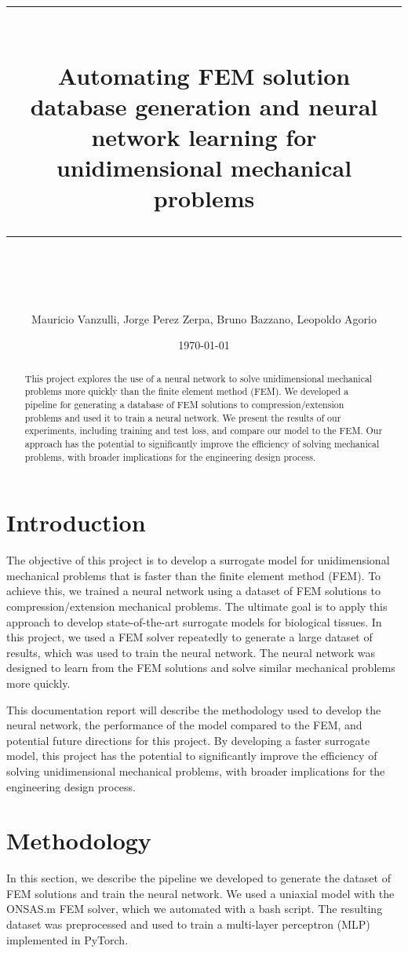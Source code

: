 \documentclass[11pt]{scrartcl} %
\title{	
	\normalfont\normalsize
	\textsc{}\\ %
	\vspace{25pt} %
	\rule{\linewidth}{0.5pt}\\ %
	\vspace{20pt} %
	{\huge Automating FEM solution database generation and neural network learning for unidimensional mechanical problems}\\ %
	\vspace{12pt} %
	\rule{\linewidth}{2pt}\\ %
	\vspace{12pt} %
}
\author{\Large Mauricio Vanzulli, Jorge Perez Zerpa, Bruno Bazzano, Leopoldo Agorio} %
\date{\normalsize\today} %
\begin{document}
\maketitle %


\begin{abstract}
	This project explores the use of a neural network to solve unidimensional mechanical problems more quickly than the finite element method (FEM). We developed a pipeline for generating a database of FEM solutions to compression/extension problems and used it to train a neural network. We present the results of our experiments, including training and test loss, and compare our model to the FEM. Our approach has the potential to significantly improve the efficiency of solving mechanical problems, with broader implications for the engineering design process.
\end{abstract}
\section{Introduction}
The objective of this project is to develop a surrogate model for unidimensional mechanical problems that is faster than the finite element method (FEM). To achieve this, we trained a neural network using a dataset of FEM solutions to compression/extension mechanical problems. The ultimate goal is to apply this approach to develop state-of-the-art surrogate models for biological tissues. In this project, we used a FEM solver repeatedly to generate a large dataset of results, which was used to train the neural network. The neural network was designed to learn from the FEM solutions and solve similar mechanical problems more quickly.

This documentation report will describe the methodology used to develop the neural network, the performance of the model compared to the FEM, and potential future directions for this project. By developing a faster surrogate model, this project has the potential to significantly improve the efficiency of solving unidimensional mechanical problems, with broader implications for the engineering design process.

\section{Methodology}
In this section, we describe the pipeline we developed to generate the dataset of FEM solutions and train the neural network. We used a uniaxial model with the ONSAS.m FEM solver, which we automated with a bash script. The resulting dataset was preprocessed and used to train a multi-layer perceptron (MLP) implemented in PyTorch.
\end{document}
